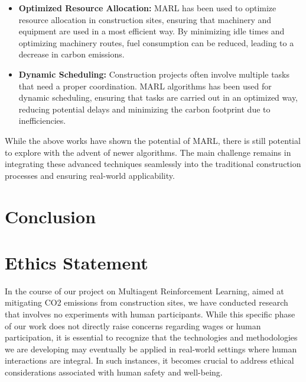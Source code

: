 \documentclass[conference]{IEEEtran}
\begin{document}
\begin{itemize}

\item \textbf{Optimized Resource Allocation:}
MARL has been used to optimize resource allocation in construction sites, ensuring that machinery and equipment are used in a most efficient way. By minimizing idle times and optimizing machinery routes, fuel consumption can be reduced, leading to a decrease in carbon emissions\cite{resource_allocation}.

\item \textbf{Dynamic Scheduling:}
Construction projects often involve multiple tasks that need a proper coordination. MARL algorithms has been used for dynamic scheduling, ensuring that tasks are carried out in an optimized way, reducing potential delays and minimizing the carbon footprint due to inefficiencies\cite{dynamic_scheduling}.

\end{itemize}

While the above works have shown the potential of MARL, there is still potential to explore with the advent of newer algorithms. The main challenge remains in integrating these advanced techniques seamlessly into the traditional construction processes and ensuring real-world applicability.

\noindent


\section{Conclusion}




\newpage




\newpage

\appendices 
\section{Ethics Statement}
In the course of our project on Multiagent Reinforcement Learning, aimed at mitigating CO2 emissions
from construction sites, we have conducted research that involves no experiments with human participants.
While this specific phase of our work does not directly raise concerns regarding wages or human
participation, it is essential to recognize that the technologies and methodologies we are developing
may eventually be applied in real-world settings where human interactions are integral. In such instances,
it becomes crucial to address ethical considerations associated with human safety and well-being.
\end{document}
